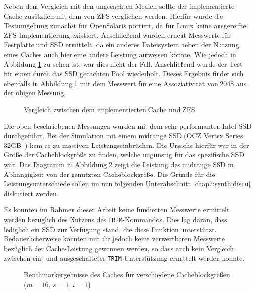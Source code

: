 Neben dem Vergleich mit den ungecachten Medien sollte der implementierte Cache zusätzlich mit dem von ZFS verglichen werden. Hierfür wurde die Testumgebung
zunächst für OpenSolaris portiert, da für Linux keine ausgereifte ZFS Implementierung existiert. Anschließend wurden erneut Messwerte für Festplatte und
\ac{SSD} ermittelt, da ein anderes Dateisystem neben der Nutzung eines Caches auch hier eine andere Leistung aufweisen könnte. Wie jedoch in Abbildung \ref{img:time-zfs}
zu sehen ist, war dies nicht der Fall. Anschließend wurde der Test für einen durch das \ac{SSD} gecachten Pool wiederholt. Dieses Ergebnis findet sich ebenfalls
in Abbildung \ref{img:time-zfs} mit dem Messwert für eine Assoziativität von 2048 aus der obigen Messung.

\begin{figure}[b!]\centering
    \caption{Vergleich zwischen dem implementierten Cache und ZFS}
    \label{img:time-zfs}
\end{figure}

Die oben beschriebenen Messungen wurden mit dem sehr performanten Intel-\ac{SSD} durchgeführt. Bei der Simulation mit einem midrange \ac{SSD} (OCZ Vertex Series
32GB~\cite{ocz:ssd}) kam es zu massiven Leistungseinbrüchen. Die Ursache hierfür war in der Größe der Cache\-block\-größe zu finden, welche ungünstig für das
spezifische \ac{SSD} war. Das Diagramm in Abbildung \ref{img:size} zeigt die Leistung des midrange \ac{SSD} in Abhängigkeit von der genutzten Cacheblockgröße.
Die Gründe für die Leistungsunterschiede sollen im nun folgenden Unterabschnitt \ref{chap7:synth:discu} diskutiert werden.

Es konnten im Rahmen dieser Arbeit keine fundierten Messwerte ermittelt werden be\-züg\-lich des Nutzens des \texttt{TRIM}-Kommandos. Dies lag daran, dass lediglich
ein \ac{SSD} zur Verfügung stand, die diese Funktion unterstützt. Bedauerlicherweise konnten mit ihr jedoch keine verwertbaren Messwerte bezüglich der
Cache-Leistung gewonnen werden, so dass auch kein Vergleich zwischen ein- und ausgeschalteter \texttt{TRIM}-Unterstützung ermittelt werden konnte.

\begin{figure}[b!]\centering
    \caption[Benchmarkergebnisse des Caches für verschiedene Cacheblockgrößen]{Benchmarkergebnisse des Caches für verschiedene Cacheblockgrößen ($m=16$, $s=1$,
    $i=1$)}
    \label{img:size}
\end{figure}

